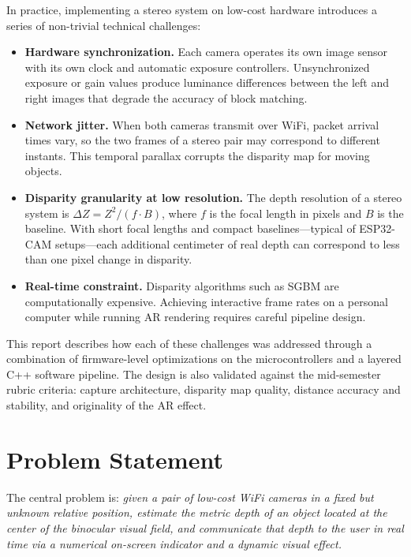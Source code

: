 \documentclass[12pt, a4paper]{article}
\begin{document}
In practice, implementing a stereo system on low-cost hardware introduces a series
of non-trivial technical challenges:

\begin{itemize}[leftmargin=2em]
  \item \textbf{Hardware synchronization.} Each camera operates its own image sensor
        with its own clock and automatic exposure controllers. Unsynchronized exposure
        or gain values produce luminance differences between the left and right images
        that degrade the accuracy of block matching.
  \item \textbf{Network jitter.} When both cameras transmit over WiFi, packet arrival
        times vary, so the two frames of a stereo pair may correspond to different
        instants. This temporal parallax corrupts the disparity map for moving objects.
  \item \textbf{Disparity granularity at low resolution.} The depth resolution of a
        stereo system is $\Delta Z = Z^2 / (f \cdot B)$, where $f$ is the focal length
        in pixels and $B$ is the baseline. With short focal lengths and compact
        baselines---typical of ESP32-CAM setups---each additional centimeter of real
        depth can correspond to less than one pixel change in disparity.
  \item \textbf{Real-time constraint.} Disparity algorithms such as SGBM are
        computationally expensive. Achieving interactive frame rates on a personal
        computer while running AR rendering requires careful pipeline design.
\end{itemize}

This report describes how each of these challenges was addressed through a combination
of firmware-level optimizations on the microcontrollers and a layered C++ software
pipeline. The design is also validated against the mid-semester rubric criteria:
capture architecture, disparity map quality, distance accuracy and stability, and
originality of the AR effect.

\section{Problem Statement}

The central problem is: \textit{given a pair of low-cost WiFi cameras in a fixed but
unknown relative position, estimate the metric depth of an object located at the
center of the binocular visual field, and communicate that depth to the user in real
time via a numerical on-screen indicator and a dynamic visual effect.}
\end{document}
